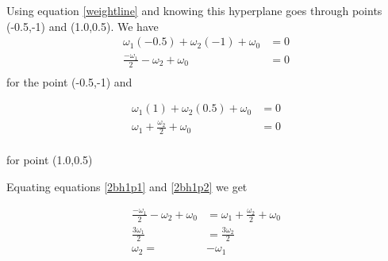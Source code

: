 \documentclass[10pt,a4paper]{article}
\begin{document}
\begin{center}
\end{center}

Using equation \ref{weightline} and knowing this hyperplane goes through points (-0.5,-1) and (1.0,0.5).
We have  
\begin{equation}
\label{2bh1p1}
\begin{split}
\omega_1(-0.5) + \omega_2(-1) + \omega_0 &= 0 \\
\frac{-\omega_1}{2} - \omega_2 + \omega_0 &= 0 \\
\end{split}
\end{equation}
for the point (-0.5,-1) and

\begin{equation}
\label{2bh1p2}
\begin{split}
\omega_1(1) + \omega_2(0.5) + \omega_0 &= 0 \\
\omega_1 + \frac{\omega_2}{2} + \omega_0 &= 0 \\
\end{split}
\end{equation}

for point (1.0,0.5)

Equating equations \ref{2bh1p1} and \ref{2bh1p2} we get

\begin{equation}
\label{2bh1i}
\begin{split}
\frac{-\omega_1}{2} - \omega_2 + \omega_0 &= \omega_1 + \frac{\omega_2}{2} + \omega_0\\
\frac{3\omega_1}{2} &= \frac{3\omega_2}{2}\\
\omega_2 =& - \omega_1\\
\end{split}
\end{equation}
\end{document}
